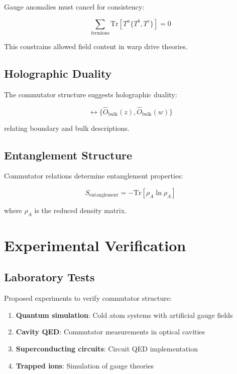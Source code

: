 \documentclass[12pt,a4paper]{article}
\begin{document}
Gauge anomalies must cancel for consistency:

\begin{equation}
\sum_{\text{fermions}} \text{Tr}[T^a \{T^b, T^c\}] = 0
\end{equation}

This constrains allowed field content in warp drive theories.

\subsection{Holographic Duality}

The commutator structure suggests holographic duality:

\begin{equation}
[\hat{O}_{\text{boundary}}(x), \hat{O}_{\text{boundary}}(y)] \leftrightarrow \{\hat{O}_{\text{bulk}}(z), \hat{O}_{\text{bulk}}(w)\}
\end{equation}

relating boundary and bulk descriptions.

\subsection{Entanglement Structure}

Commutator relations determine entanglement properties:

\begin{equation}
S_{\text{entanglement}} = -\text{Tr}[\rho_A \ln \rho_A]
\end{equation}

where $\rho_A$ is the reduced density matrix.

\section{Experimental Verification}

\subsection{Laboratory Tests}

Proposed experiments to verify commutator structure:

\begin{enumerate}
\item \textbf{Quantum simulation}: Cold atom systems with artificial gauge fields
\item \textbf{Cavity QED}: Commutator measurements in optical cavities
\item \textbf{Superconducting circuits}: Circuit QED implementation
\item \textbf{Trapped ions}: Simulation of gauge theories
\end{enumerate}
\end{document}
